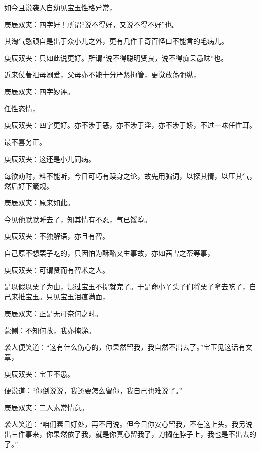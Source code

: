 \begin{parag}
    如今且说袭人自幼见宝玉性格异常，\begin{note}庚辰双夹：四字好！所谓“说不得好，又说不得不好”也。\end{note}其淘气憨顽自是出于众小儿之外，更有几件千奇百怪口不能言的毛病儿。\begin{note}庚辰双夹：只如此说更好。所谓“说不得聪明贤良，说不得痴呆愚昧”也。\end{note}近来仗著祖母溺爱，父母亦不能十分严紧拘管，更觉放荡弛纵，\begin{note}庚辰双夹：四字妙评。\end{note}任性恣情，\begin{note}庚辰双夹：四字更好。亦不涉于恶，亦不涉于淫，亦不涉于娇，不过一味任性耳。\end{note}最不喜务正。\begin{note}庚辰双夹：这还是小儿同病。\end{note}每欲劝时，料不能听，今日可巧有赎身之论，故先用骗词，以探其情，以压其气，然后好下箴规。\begin{note}庚辰双夹：原来如此。\end{note}今见他默默睡去了，知其情有不忍，气已馁堕。\begin{note}庚辰双夹：不独解语，亦且有智。\end{note}自己原不想栗子吃的，只因怕为酥酪又生事故，亦如茜雪之茶等事，\begin{note}庚辰双夹：可谓贤而有智术之人。\end{note}是以假以栗子为由，混过宝玉不提就完了。于是命小丫头子们将栗子拿去吃了，自己来推宝玉。只见宝玉泪痕满面，\begin{note}庚辰双夹：正是无可奈何之时。\end{note}\begin{note}蒙侧：不知何故，我亦掩涕。\end{note}袭人便笑道：“这有什么伤心的，你果然留我，我自然不出去了。”宝玉见这话有文章，\begin{note}庚辰双夹：宝玉不愚。\end{note}便说道：“你倒说说，我还要怎么留你，我自己也难说了。”\begin{note}庚辰双夹：二人素常情意。\end{note}袭人笑道：“咱们素日好处，再不用说。但今日你安心留我，不在这上头。我另说出三件事来，你果然依了我，就是你真心留我了，刀搁在脖子上，我也是不出去的了。”
\end{parag}


